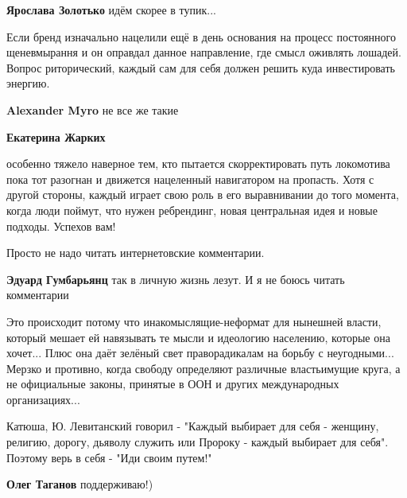 \begin{itemize}
\begin{itemize} %
\textbf{Ярослава Золотько} идём скорее в тупик...
\end{itemize} %


Если бренд изначально нацелили ещё в день основания на процесс постоянного
щеневмырання и он оправдал данное направление, где смысл оживлять лошадей.
Вопрос риторический, каждый сам для себя должен решить куда инвестировать
энергию.

\begin{itemize} %
\textbf{Alexander Myro} не все же такие

\textbf{Екатерина Жарких} 

особенно тяжело наверное тем, кто пытается скорректировать путь локомотива пока
тот разогнан и движется нацеленный навигатором на пропасть. Хотя с другой
стороны, каждый играет свою роль в его выравнивании до того момента, когда люди
поймут, что нужен ребрендинг, новая центральная идея и новые подходы. Успехов
вам!

\end{itemize} %

Просто не надо читать интернетовские комментарии.

\begin{itemize} %
\textbf{Эдуард Гумбарьянц} так в личную жизнь лезут. И я не боюсь читать комментарии
\end{itemize} %


Это происходит потому что инакомыслящие-неформат для нынешней власти, который
мешает ей навязывать те мысли и идеологию населению, которые она хочет... Плюс
она даёт зелёный свет праворадикалам на борьбу с неугодными... Мерзко и
противно, когда свободу определяют различные властьимущие круга, а не официальные
законы, принятые в ООН и других международных организациях...


Катюша, Ю. Левитанский говорил - "Каждый выбирает для себя - женщину, религию,
дорогу, дьяволу служить или Пророку - каждый выбирает для себя". Поэтому верь в
себя - "Иди своим путем!"

\begin{itemize} %
\textbf{Олег Таганов} поддерживаю!)
\end{itemize} %


\end{itemize} %
